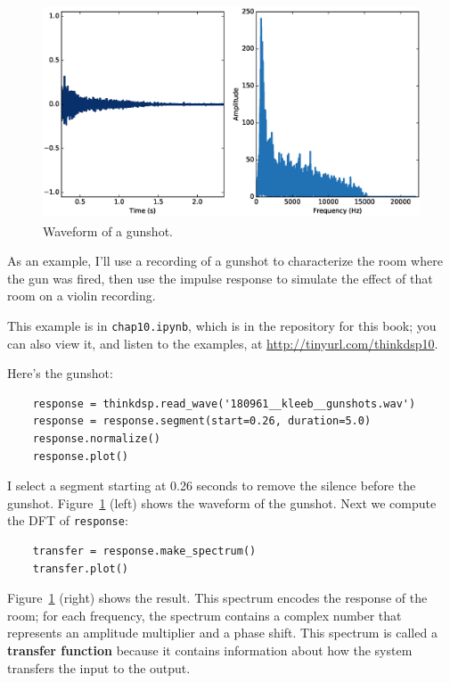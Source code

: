 \documentclass[12pt]{book}
\begin{document}
\begin{figure}
\centerline{\includegraphics[height=2.5in]{figs/systems6.eps}}
\caption{Waveform of a gunshot.}
\label{fig.systems6}
\end{figure}

As an example, I'll use a recording of a gunshot to characterize
the room where the gun was fired, then use the impulse response
to simulate the effect of that room on a violin recording.

This example is in {\tt chap10.ipynb}, which is in the repository
for this book; you can also view it, and listen to the examples,
at \url{http://tinyurl.com/thinkdsp10}.

Here's the gunshot:

\begin{verbatim}
    response = thinkdsp.read_wave('180961__kleeb__gunshots.wav')
    response = response.segment(start=0.26, duration=5.0)
    response.normalize()
    response.plot()
\end{verbatim}

I select a segment starting at 0.26 seconds to remove the silence
before the gunshot.  Figure~\ref{fig.systems6} (left) shows the
waveform of the gunshot.  Next we compute the DFT of {\tt response}:

\begin{verbatim}
    transfer = response.make_spectrum()
    transfer.plot()
\end{verbatim}

Figure~\ref{fig.systems6} (right) shows the result.  This spectrum
encodes the response of the room; for each frequency, the spectrum
contains a complex number that represents an amplitude multiplier and
a phase shift.  This spectrum is called a {\bf transfer
function} because it contains information about how the system transfers
the input to the output.
\end{document}
